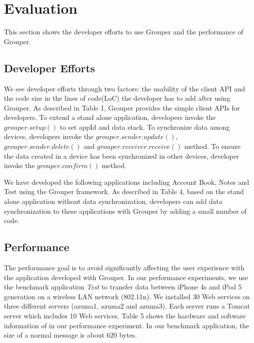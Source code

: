 \documentclass[twocolumn,10pt]{article}
\begin{document}
\section{Evaluation}

This section shows the developer efforts to use Grouper and the performance of Grouper.

\subsection{Developer Efforts}

We see developer efforts through two factors: the usability of the client API and the code size in the lines of code(LoC) the developer has to add after using Grouper. 
As described in Table 1, Grouper provides the simple client APIs for developers.
To extend a stand alone application, developers invoke the $grouper.setup()$ to set appId and data stack.
To synchronize data among devices, developers invoke the $grouper.sender.update()$, $grouper.sender.delete()$ and $grouper.receiver.receive()$ method.
To ensure the data created in a device has been synchronized in other devices, developer invoke the $grouper.confirm()$ method.

We have developed the following applications including Account Book, Notes and Test using the Grouper framework.
As described in Table 4, based on the stand alone application without data synchronization, developers can add data synchronization to these applications with Grouper by adding a small number of code. 

\subsection{Performance}

The performance goal is to avoid significantly affecting the user experience with the application developed with Grouper. 
In our performance experiments, we use the benchmark application \emph{Test} to transfer data between iPhone 4s and iPod 5 generation on a wireless LAN network (802.11n).
We installed 30 Web services on three different servers (azuma1, azuma2 and azuma3).
Each server runs a Tomcat server which includes 10 Web services.
Table 5 shows the hardware and software information of in our performance experiment.
In our benchmark application, the size of a normal message is about 620 bytes.
\end{document}
